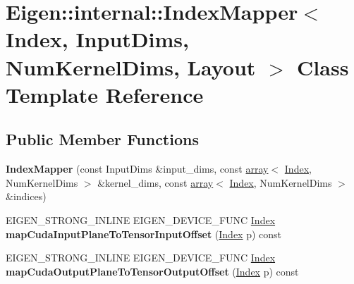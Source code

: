 \hypertarget{class_eigen_1_1internal_1_1_index_mapper}{}\section{Eigen\+:\+:internal\+:\+:Index\+Mapper$<$ Index, Input\+Dims, Num\+Kernel\+Dims, Layout $>$ Class Template Reference}
\label{class_eigen_1_1internal_1_1_index_mapper}
\subsection*{Public Member Functions}
\begin{DoxyCompactItemize}
\item 
\mbox{\label{class_eigen_1_1internal_1_1_index_mapper_a7d78e769adb4267d2f6e0e38a1fc2553}} 
{\bfseries Index\+Mapper} (const Input\+Dims \&input\+\_\+dims, const \hyperlink{class_eigen_1_1array}{array}$<$ \hyperlink{namespace_eigen_a62e77e0933482dafde8fe197d9a2cfde}{Index}, Num\+Kernel\+Dims $>$ \&kernel\+\_\+dims, const \hyperlink{class_eigen_1_1array}{array}$<$ \hyperlink{namespace_eigen_a62e77e0933482dafde8fe197d9a2cfde}{Index}, Num\+Kernel\+Dims $>$ \&indices)
\item 
\mbox{\label{class_eigen_1_1internal_1_1_index_mapper_a84f36b2d2263f07075c47d4e1f5a71b4}} 
E\+I\+G\+E\+N\+\_\+\+S\+T\+R\+O\+N\+G\+\_\+\+I\+N\+L\+I\+NE E\+I\+G\+E\+N\+\_\+\+D\+E\+V\+I\+C\+E\+\_\+\+F\+U\+NC \hyperlink{namespace_eigen_a62e77e0933482dafde8fe197d9a2cfde}{Index} {\bfseries map\+Cuda\+Input\+Plane\+To\+Tensor\+Input\+Offset} (\hyperlink{namespace_eigen_a62e77e0933482dafde8fe197d9a2cfde}{Index} p) const
\item 
\mbox{\label{class_eigen_1_1internal_1_1_index_mapper_a5bb5c53cbf626f5016214d34a6c01125}} 
E\+I\+G\+E\+N\+\_\+\+S\+T\+R\+O\+N\+G\+\_\+\+I\+N\+L\+I\+NE E\+I\+G\+E\+N\+\_\+\+D\+E\+V\+I\+C\+E\+\_\+\+F\+U\+NC \hyperlink{namespace_eigen_a62e77e0933482dafde8fe197d9a2cfde}{Index} {\bfseries map\+Cuda\+Output\+Plane\+To\+Tensor\+Output\+Offset} (\hyperlink{namespace_eigen_a62e77e0933482dafde8fe197d9a2cfde}{Index} p) const
\item 

\end{DoxyCompactItemize}
